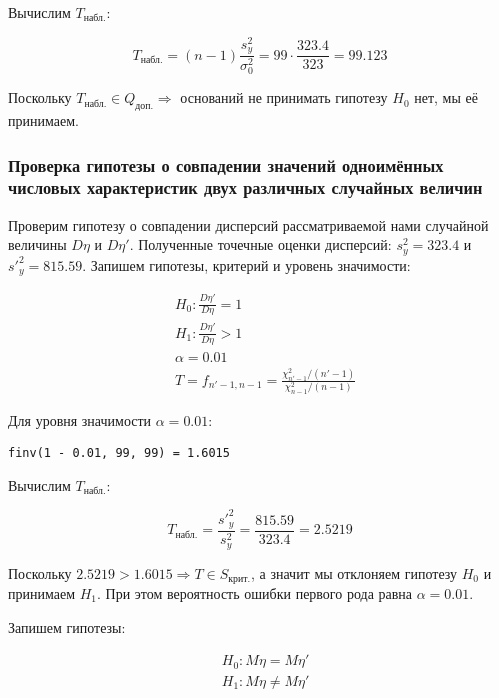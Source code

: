 \documentclass{report}
\begin{document}
Вычислим $T_\text{набл.}$:

\begin{equation}
T_\text{набл.} = \left(n-1\right) \frac{s_y^2}{\sigma^2_0} = 99 \cdot \frac{323.4}{323} = 99.123
\end{equation}

Поскольку $T_\text{набл.} \in Q_\text{доп.} \Rightarrow$ оснований не принимать гипотезу $H_0$ нет, мы её принимаем.

\newpage

\subsubsection{Проверка гипотезы о совпадении значений одноимённых числовых характеристик двух различных случайных величин}

Проверим гипотезу о совпадении дисперсий рассматриваемой нами случайной величины $D\eta$ и $D\eta'$. Полученные точечные оценки дисперсий: $s^2_y = 323.4$ и $s'^2_y = 815.59$. Запишем гипотезы, критерий и уровень значимости:

\begin{equation*}
\begin{split}
& H_0 : \frac{D\eta'}{D\eta} = 1 \\
& H_1 : \frac{D\eta'}{D\eta} > 1 \\
& \alpha = 0.01 \\
& T = f_{n'-1, n-1} = \frac{\chi^2_{n'-1} / \left(n' - 1\right)}{\chi^2_{n-1} / \left(n - 1\right)}
\end{split}
\end{equation*}

Для уровня значимости $\alpha = 0.01$:

\begin{lstlisting}
finv(1 - 0.01, 99, 99) = 1.6015
\end{lstlisting}

Вычислим $T_\text{набл.}$:

\begin{equation}
T_\text{набл.} = \frac{s'^2_y}{s^2_y} = \frac{815.59}{323.4} = 2.5219
\end{equation}

Поскольку $2.5219 > 1.6015 \Rightarrow T \in S_\text{крит.}$, а значит мы отклоняем гипотезу $H_0$ и принимаем $H_1$. При этом вероятность ошибки первого рода равна $\alpha = 0.01$.

Запишем гипотезы:

\begin{equation*}
\begin{split}
& H_0 : M\eta = M\eta' \\
& H_1 : M\eta \ne M\eta'
\end{split}
\end{equation*}
\end{document}
